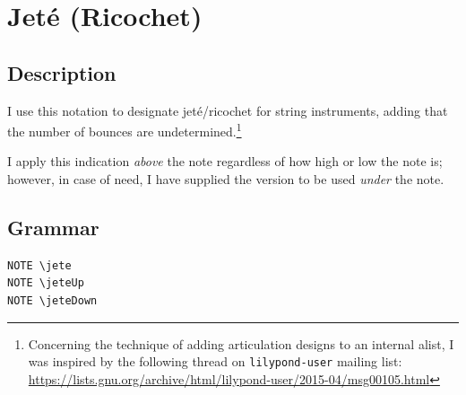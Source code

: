 

\section {Jeté (Ricochet)}
\hfill
{}
\hfill

\subsection{Description}
I use this notation to designate jeté/ricochet for string instruments, adding that the number of bounces are undetermined.\footnote{Concerning the technique of adding articulation designs to an internal alist, I was inspired by the following thread on \Verb|lilypond-user| mailing list: \url{https://lists.gnu.org/archive/html/lilypond-user/2015-04/msg00105.html}}  

I apply this indication \textit{above} the note regardless of how high or low the note is; however, in case of need, I have supplied the version to be used \textit{under} the note.
\subsection{Grammar}
\begin{verbatim}
NOTE \jete
NOTE \jeteUp
NOTE \jeteDown
\end{verbatim}
